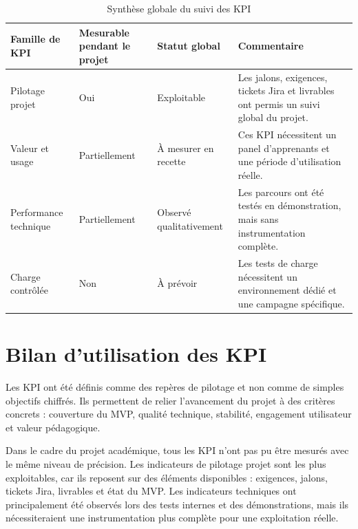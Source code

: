 \begin{table}[H]
\centering
\renewcommand{\arraystretch}{1.25}
\small
\begin{tabular}{|p{4cm}|p{3cm}|p{3cm}|p{4cm}|}
\hline
\rowcolor{gray!20}
\textbf{Famille de KPI} & \textbf{Mesurable pendant le projet} & \textbf{Statut global} & \textbf{Commentaire} \\
\hline

Pilotage projet 
& Oui 
& Exploitable 
& Les jalons, exigences, tickets Jira et livrables ont permis un suivi global du projet. \\
\hline

Valeur et usage 
& Partiellement 
& À mesurer en recette 
& Ces KPI nécessitent un panel d'apprenants et une période d'utilisation réelle. \\
\hline

Performance technique 
& Partiellement 
& Observé qualitativement 
& Les parcours ont été testés en démonstration, mais sans instrumentation complète. \\
\hline

Charge contrôlée 
& Non 
& À prévoir 
& Les tests de charge nécessitent un environnement dédié et une campagne spécifique. \\
\hline

\end{tabular}
\caption{Synthèse globale du suivi des KPI}
\label{tab:synthese-kpi}
\end{table}

\section{Bilan d'utilisation des KPI}

Les KPI ont été définis comme des repères de pilotage et non comme de simples objectifs chiffrés. 
Ils permettent de relier l'avancement du projet à des critères concrets : couverture du MVP, qualité technique, stabilité, engagement utilisateur et valeur pédagogique.

Dans le cadre du projet académique, tous les KPI n'ont pas pu être mesurés avec le même niveau de précision. 
Les indicateurs de pilotage projet sont les plus exploitables, car ils reposent sur des éléments disponibles : exigences, jalons, tickets Jira, livrables et état du MVP. 
Les indicateurs techniques ont principalement été observés lors des tests internes et des démonstrations, mais ils nécessiteraient une instrumentation plus complète pour une exploitation réelle.

